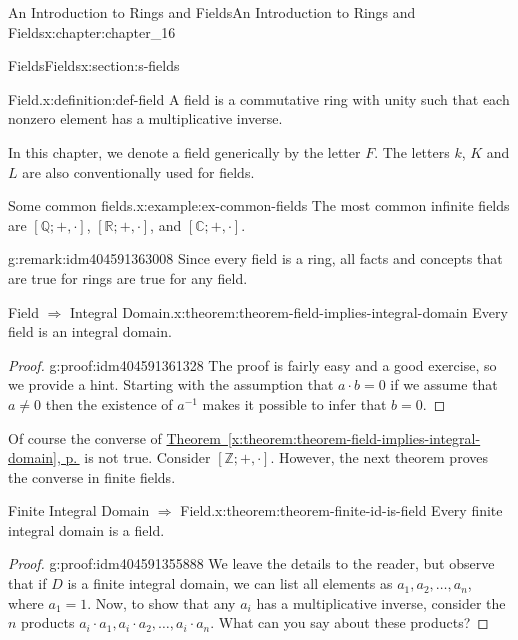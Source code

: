 \documentclass[twoside,10pt,]{book}
\newcommand{\xreffont}{\relax}
\numberwithin{equation}{section}
\begin{document}
\begin{chapterptx}{An Introduction to Rings and Fields}{}{An Introduction to Rings and Fields}{}{}{x:chapter:chapter_16}
\begin{sectionptx}{Fields}{}{Fields}{}{}{x:section:s-fields}
\begin{definition}{Field.}{x:definition:def-field}%
%
A field is a commutative ring with unity such that each nonzero element has a multiplicative inverse.%
\end{definition}
In this chapter, we denote a field generically by the letter \(F\).  The letters \(k\), \(K\) and \(L\) are also conventionally used for fields.%
\begin{example}{Some common fields.}{x:example:ex-common-fields}%
The most common infinite fields are \([\mathbb{Q}; +, \cdot ]\), \([\mathbb{R}; +, \cdot ]\),  and \([\mathbb{C}; +, \cdot ]\).%
\end{example}
\begin{remark}{}{g:remark:idm404591363008}%
Since every field is a ring, all facts and concepts that are true for rings are true for any field.%
\end{remark}
\begin{theorem}{Field \(\Rightarrow\) Integral Domain.}{}{x:theorem:theorem-field-implies-integral-domain}%
Every field is an integral domain.%
\end{theorem}
\begin{proof}{}{g:proof:idm404591361328}
The proof is fairly easy and a good exercise, so we provide a hint.  Starting with the assumption that \(a\cdot b= 0\) if we assume that \(a \neq 0\) then the existence of \(a^{-1}\) makes it possible to infer that \(b=0\).%
\end{proof}
Of course the converse of \hyperref[x:theorem:theorem-field-implies-integral-domain]{Theorem~{\xreffont\ref{x:theorem:theorem-field-implies-integral-domain}}, p.\,\pageref{x:theorem:theorem-field-implies-integral-domain}} is not true.  Consider \([\mathbb{Z}; +, \cdot ]\).  However, the next theorem proves the converse in finite fields.%
\begin{theorem}{Finite Integral Domain \(\Rightarrow\) Field.}{}{x:theorem:theorem-finite-id-is-field}%
Every finite integral domain is a field.%
\end{theorem}
\begin{proof}{}{g:proof:idm404591355888}
We leave the details to the reader, but observe that if \(D\) is a finite integral domain, we can list all elements as \(a_1,	a_2, \ldots, a_n\), where \(a_1=1\).   Now, to show that any \(a_i\) has a multiplicative inverse, consider the \(n\) products \(a_i \cdot a_1,	a_i \cdot a_2, \ldots, a_i \cdot a_n\).  What can you say about these products?%
\end{proof}

\end{sectionptx}
\end{chapterptx}
\end{document}
